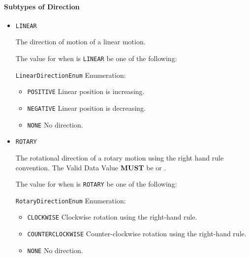 \paragraph{Subtypes of Direction}\mbox{}
\label{sec:Subtypes of Direction}

\begin{itemize}

\item \texttt{LINEAR}


The direction of motion of a linear motion.


The value for  when  is \texttt{LINEAR} \MUST be one of the following: 


\texttt{LinearDirectionEnum} Enumeration:

\begin{itemize}
\item \texttt{POSITIVE} \newline Linear position is increasing. 
\item \texttt{NEGATIVE} \newline Linear position is decreasing. 
\item \texttt{NONE} \newline No direction. 
\end{itemize}

\item \texttt{ROTARY}


The rotational direction of a rotary motion using the right hand rule convention.
 The \gls{Valid Data Value} \textbf{MUST} be  or .


The value for  when  is \texttt{ROTARY} \MUST be one of the following: 


\texttt{RotaryDirectionEnum} Enumeration:

\begin{itemize}
\item \texttt{CLOCKWISE} \newline Clockwise rotation using the right-hand rule. 
\item \texttt{COUNTER\textunderscore CLOCKWISE} \newline Counter-clockwise rotation using the right-hand rule. 
\item \texttt{NONE} \newline No direction. 
\end{itemize}


\end{itemize}

